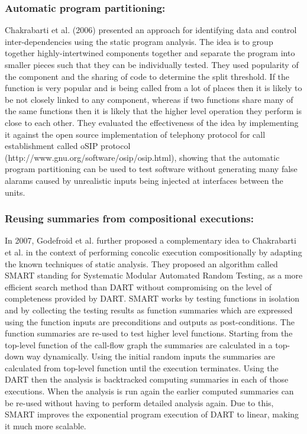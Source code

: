 \documentclass[ runningheads,
               a4paper]{llncs}
\begin{document}
\subsubsection{Automatic program partitioning:}
Chakrabarti et al. (2006) \cite{chakrabarti2006software} presented an approach for identifying data and control inter-dependencies using the static program analysis. The idea is to group together highly-intertwined components together and separate the program into smaller pieces such that they can be individually tested. They used popularity of the component and the sharing of code to determine the split threshold. If the function is very popular and is being called from a lot of places then it is likely to be not closely linked to any component, whereas if two functions share many of the same functions then it is likely that the higher level operation they perform is close to each other. They evaluated the effectiveness of the idea by implementing it against the open source implementation of telephony protocol for call establishment called oSIP protocol (http://www.gnu.org/software/osip/osip.html), showing that the automatic program partitioning can be used to test software without generating many false alarams caused by unrealistic inputs being injected at interfaces between the units.


\subsubsection{Reusing summaries from compositional executions:}
In 2007, Godefroid et al. \cite{godefroid2007compositional} further proposed a complementary idea \cite{godefroid2007compositional} to Chakrabarti et al. \cite{chakrabarti2006software} in the context of performing concolic execution compositionally by adapting the known techniques of static analysis. They proposed an algorithm called SMART standing for Systematic Modular Automated Random Testing, as a more efficient search method than DART \cite{godefroid2005dart} without compromising on the level of completeness provided by DART. SMART works by testing functions in isolation and by collecting the testing results as function summaries which are expressed using the function inputs are preconditions and outputs as post-conditions. The function summaries are re-used to test higher level functions. Starting from the top-level function of the call-flow graph the summaries are calculated in a top-down way dynamically. Using the initial random inputs the summaries are calculated from top-level function until the execution terminates. Using the DART then the analysis is backtracked computing summaries in each of those executions. When the analysis is run again the earlier computed summaries can be re-used without having to perform detailed analysis again. Due to this, SMART improves the exponential program execution of DART to linear, making it much more scalable.
\end{document}
